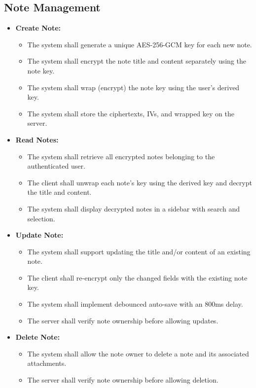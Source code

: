 \subsection{Note Management}

\begin{itemize}
    \item \textbf{Create Note:}
    \begin{itemize}
        \item The system shall generate a unique AES-256-GCM key for each new note.
        \item The system shall encrypt the note title and content separately using the note key.
        \item The system shall wrap (encrypt) the note key using the user's derived key.
        \item The system shall store the ciphertexts, IVs, and wrapped key on the server.
    \end{itemize}

    \item \textbf{Read Notes:}
    \begin{itemize}
        \item The system shall retrieve all encrypted notes belonging to the authenticated user.
        \item The client shall unwrap each note's key using the derived key and decrypt the title and content.
        \item The system shall display decrypted notes in a sidebar with search and selection.
    \end{itemize}

    \item \textbf{Update Note:}
    \begin{itemize}
        \item The system shall support updating the title and/or content of an existing note.
        \item The client shall re-encrypt only the changed fields with the existing note key.
        \item The system shall implement debounced auto-save with an 800ms delay.
        \item The server shall verify note ownership before allowing updates.
    \end{itemize}

    \item \textbf{Delete Note:}
    \begin{itemize}
        \item The system shall allow the note owner to delete a note and its associated attachments.
        \item The server shall verify note ownership before allowing deletion.
    \end{itemize}
\end{itemize}

